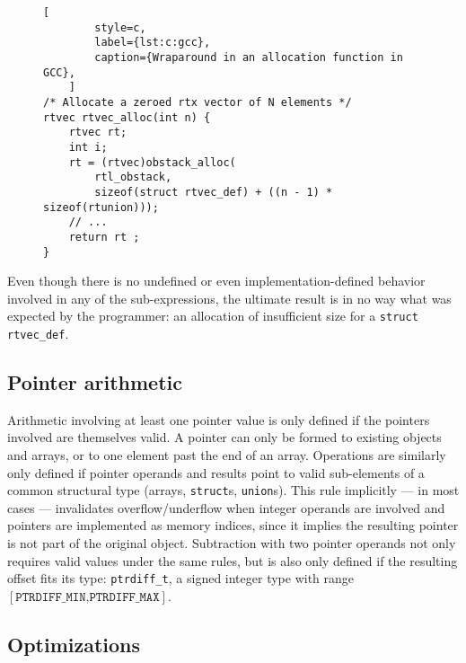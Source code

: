 \begin{figure}[ht]
    \begin{lstlisting}[
        style=c,
        label={lst:c:gcc},
        caption={Wraparound in an allocation function in GCC},
    ]
/* Allocate a zeroed rtx vector of N elements */
rtvec rtvec_alloc(int n) {
    rtvec rt;
    int i;
    rt = (rtvec)obstack_alloc(
        rtl_obstack,
        sizeof(struct rtvec_def) + ((n - 1) * sizeof(rtunion)));
    // ...
    return rt ;
}
    \end{lstlisting}
\end{figure}

Even though there is no undefined or even implementation-defined behavior
involved in any of the sub-expressions, the ultimate result is in no way what
was expected by the programmer: an allocation of insufficient size for a
\texttt{struct rtvec\_def}\footnotemark.


\subsection{Pointer arithmetic}

Arithmetic involving at least one pointer value is only defined if the pointers
involved are themselves valid.  A pointer can only be formed to existing objects
and arrays, or to one element past the end of an array.  Operations are
similarly only defined if pointer operands and results point to valid
sub-elements of a common structural type (arrays, \texttt{struct}s,
\texttt{union}s).  This rule implicitly --- in most cases --- invalidates
overflow/underflow when integer operands are involved and pointers are
implemented as memory indices, since it implies the resulting pointer is not
part of the original object.  Subtraction with two pointer operands not only
requires valid values under the same rules, but is also only defined if the
resulting offset fits its type: \texttt{ptrdiff\_t}, a signed integer type with
range $[\texttt{PTRDIFF\_MIN,PTRDIFF\_MAX}]$.

\subsection{Optimizations}

